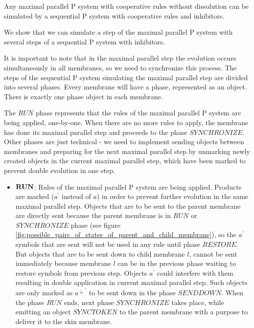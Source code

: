 \begin{veta}
  Any maximal parallel P system with cooperative rules without dissolution can be simulated by a sequential P system with cooperative rules and inhibitors.
\end{veta}

\begin{dokaz}
  We show that we can simulate a step of the maximal parallel P system with several steps of a sequential P system with inhibitors.


  It is important to note that in the maximal parallel step the evolution occurs simultaneously in all membranes, so we need to synchronize this process.
  The steps of the sequential P system simulating the maximal parallel step are divided into several phases. Every membrane will have a phase, represented as an object. There is exactly one phase object in each membrane. 

  The $\mathit{RUN}$ phase represents that the rules of the maximal parallel P system are being applied, one-by-one. When there are no more rules to apply, the membrane has done its maximal parallel step and proceeds to the phase $\mathit{SYNCHRONIZE}$. Other phases are just technical - we need to implement sending objects between membranes and preparing for the next maximal parallel step by unmarking newly created objects in the current maximal parallel step, which have been marked to prevent double evolution in one step.

  \begin{itemize}
    \item $\mathit{\bf RUN}$: Rules of the maximal parallel P system are being applied. Products are marked ($a^\prime$ instead of $a$) in order to prevent further evolution in the same maximal parallel step. Objects that are to be sent to the parent membrane are directly sent because the parent membrane is in $\mathit{RUN}$ or $\mathit{SYNCHRONIZE}$ phase (see figure \ref{fig:possible_pairs_of_states_of_parent_and_child_membrane}), so the $a^{\prime}$ symbols that are sent will not be used in any rule until phase $\mathit{RESTORE}$. But objects that are to be sent down to child membrane $l$, cannot be sent immediately because membrane $l$ can be in the previous phase waiting to restore symbols from previous step. Objects $a^\prime$ could interfere with them resulting in double application in current maximal parallel step. Such objects are only marked as $a^{\downarrow_l\prime}$ to be sent down in the phase $\mathit{SENDDOWN}$. When the phase $\mathit{RUN}$ ends, next phase $\mathit{SYNCHRONIZE}$ takes place, while emitting an object $\mathit{SYNCTOKEN}$ to the parent membrane with a purpose to deliver it to the skin membrane.


\end{itemize}
\end{dokaz}
